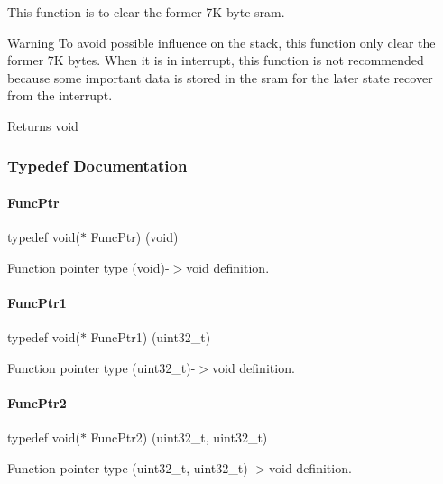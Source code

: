 This function is to clear the former 7\+K-\/byte sram. 

\begin{DoxyWarning}{Warning}
To avoid possible influence on the stack, this function only clear the former 7K bytes. When it is in interrupt, this function is not recommended because some important data is stored in the sram for the later state recover from the interrupt. 
\end{DoxyWarning}
\begin{DoxyReturn}{Returns}
void 
\end{DoxyReturn}


\subsubsection{Typedef Documentation}
\mbox{\label{a00020_a3d987633d7a3ca10c14905a807b62eb1}} 
\paragraph{\texorpdfstring{Func\+Ptr}{FuncPtr}}
{\footnotesize\ttfamily typedef void($\ast$ Func\+Ptr) (void)}

Function pointer type (void)-\/$>$void definition. \mbox{\label{a00020_a0891965816a5b721b07f7bebefaf7430}} 
\paragraph{\texorpdfstring{Func\+Ptr1}{FuncPtr1}}
{\footnotesize\ttfamily typedef void($\ast$ Func\+Ptr1) (uint32\+\_\+t)}

Function pointer type (uint32\+\_\+t)-\/$>$void definition. \mbox{\label{a00020_a331a88eeefe11112bb8fe1b43dd777b8}} 
\paragraph{\texorpdfstring{Func\+Ptr2}{FuncPtr2}}
{\footnotesize\ttfamily typedef void($\ast$ Func\+Ptr2) (uint32\+\_\+t, uint32\+\_\+t)}

Function pointer type (uint32\+\_\+t, uint32\+\_\+t)-\/$>$void definition. \mbox{\label{a00020_a06da901348542a481c297d9b700e2001}} 
